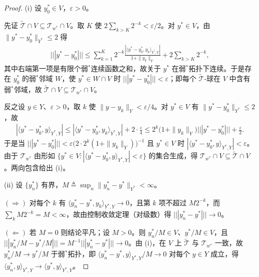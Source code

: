 \documentclass[../main.tex]{subfiles}
\begin{document}
\begin{proof}
(i) 设 $y_0^*\in V$，$\varepsilon>0$。

先证 $\widetilde{\mathscr{T}}\cap V\subseteq\mathscr{T}_{w^*}\cap V$。取 $K$ 使 $2\sum_{k>K}2^{-k}<\varepsilon/2$。对 $y^*\in V$，由 $\|y^*-y_0^*\|_{Y^*}\leqslant2$ 得
\begin{align*}
|||y^*-y_0^*|||\leqslant\sum_{k=1}^K2^{-k}\frac{|\langle y^*-y_0^*,y_k\rangle_{Y^*,Y}|}{1+\|y_k\|_Y}+2\sum_{k>K}2^{-k},
\end{align*}
其中右端第一项是有限个弱$^*$连续函数之和，故关于 $y^*$ 在弱$^*$拓扑下连续。于是存在 $y_0^*$ 的弱$^*$邻域 $W$，使 $y^*\in W\cap V$ 时 $|||y^*-y_0^*|||<\varepsilon$；即每个 $\widetilde{\mathscr{T}}$-球在 $V$ 中含有弱$^*$邻域，故 $\widetilde{\mathscr{T}}\cap V\subseteq\mathscr{T}_{w^*}\cap V$。

反之设 $y\in Y$、$\varepsilon>0$，取 $k$ 使 $\|y-y_k\|_Y<\varepsilon/4$。对 $y^*\in V$ 有 $\|y^*-y_0^*\|_{Y^*}\leqslant2$，故
\begin{align*}
|\langle y^*-y_0^*,y\rangle_{Y^*,Y}|\leqslant|\langle y^*-y_0^*,y_k\rangle_{Y^*,Y}|+2\cdot\frac{\varepsilon}{4}
\leqslant2^k\bigl(1+\|y_k\|_Y\bigr)|||y^*-y_0^*|||+\frac{\varepsilon}{2}.
\end{align*}
于是当 $|||y^*-y_0^*|||<\varepsilon\bigl(2\cdot2^k(1+\|y_k\|_Y)\bigr)^{-1}$ 且 $y^*\in V$ 时 $|\langle y^*-y_0^*,y\rangle_{Y^*,Y}|<\varepsilon$。由于 $\mathscr{T}_{w^*}$ 由形如 $\{y^*\in V:|\langle y^*-y_0^*,y\rangle_{Y^*,Y}|<\varepsilon\}$ 的集合生成，得 $\mathscr{T}_{w^*}\cap V\subseteq\widetilde{\mathscr{T}}\cap V$。两向包含给出 (i)。

(ii) 设 $\{y_n^*\}$ 有界，$M\triangleq\sup_n\|y_n^*-y^*\|_{Y^*}<\infty$。

$(\Rightarrow)$ 对每个 $k$ 有 $\langle y_n^*-y^*,y_k\rangle_{Y^*,Y}\to0$，且第 $k$ 项不超过 $M2^{-k}$，而 $\sum_kM2^{-k}=M<\infty$，故由控制收敛定理（对级数）得 $|||y_n^*-y^*|||\to0$。

$(\Leftarrow)$ 若 $M=0$ 则结论平凡；设 $M>0$。则 $y_n^*/M\in V$、$y^*/M\in V$，且 $|||y_n^*/M-y^*/M|||=M^{-1}|||y_n^*-y^*|||\to0$。由 (i)，在 $V$ 上 $\widetilde{\mathscr{T}}$ 与 $\mathscr{T}_{w^*}$ 一致，故 $y_n^*/M\to y^*/M$ 于弱$^*$拓扑，即 $\langle y_n^*-y^*,y\rangle_{Y^*,Y}/M\to0$ 对每个 $y\in Y$ 成立，得 $\langle y_n^*,y\rangle_{Y^*,Y}\to\langle y^*,y\rangle_{Y^*,Y}$。
\end{proof}
\end{document}
